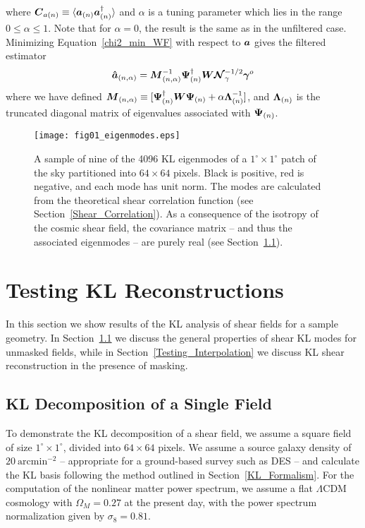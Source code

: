 where $\boldsymbol{C}_{a(n)}\equiv\langle 
\boldsymbol{a}_{(n)}\boldsymbol{a}_{(n)}^\dagger\rangle$ 
and $\alpha$ is a tuning parameter which lies in the range $0\le\alpha\le 1$. 
Note that for $\alpha=0$, the result is the same as in the unfiltered case.
Minimizing Equation~\ref{chi2_min_WF} with respect to $\boldsymbol{a}$ gives the
filtered estimator
\begin{equation}
  \label{a_WF}
  \boldsymbol{\hat{a}}_{(n,\alpha)} = 
  \boldsymbol{M}_{(n,\alpha)}^{-1} 
  \boldsymbol{\Psi}_{(n)}^\dagger \boldsymbol{W} \boldsymbol{\mathcal{N}}_\gamma^{-1/2}\boldsymbol{\gamma}^o
\end{equation}
where we have defined $\boldsymbol{M}_{(n,\alpha)} 
\equiv [\boldsymbol{\Psi}_{(n)}^\dagger\boldsymbol{W}\boldsymbol{\Psi}_{(n)} 
  + \alpha\boldsymbol{\Lambda}_{(n)}^{-1}]$, and
$\boldsymbol{\Lambda}_{(n)}$ is the truncated diagonal matrix of 
eigenvalues associated with $\boldsymbol{\Psi}_{(n)}$.

\begin{figure*}
 \centering
 \texttt{[image: fig01\_eigenmodes.eps]} 
 \caption{
   A sample of nine of the 4096 KL eigenmodes 
   of a $1^\circ\times 1^\circ$ patch of the sky partitioned into
   $64\times 64$ pixels.  Black is positive, red is negative, and each mode
   has unit norm. The modes are calculated from the theoretical
   shear correlation function (see Section~\ref{Shear_Correlation}).  
   As a consequence of the isotropy of the cosmic shear field,
   the covariance matrix -- and thus the associated eigenmodes --
   are purely real (see Section~\ref{Testing_Shear_KL}).
   \label{fig_KL_modes} }
\end{figure*} 

\section{Testing KL Reconstructions}
\label{Testing_Reconstruction}
In this section we show results of the KL analysis of shear fields for
a sample geometry.  In Section~\ref{Testing_Shear_KL} we discuss the general
properties of shear KL modes for unmasked fields, while in
Section~\ref{Testing_Interpolation} we discuss KL shear reconstruction 
in the presence of masking. 

\subsection{KL Decomposition of a Single Field}
\label{Testing_Shear_KL}
To demonstrate the KL decomposition of a shear field, we assume a square field
of size $1^\circ\times 1^\circ$, divided into $64\times 64$ pixels.  We assume
a source galaxy density of $20\ \mathrm{arcmin}^{-2}$ -- appropriate for a
ground-based survey such as DES -- and calculate the
KL basis following the method outlined in Section~\ref{KL_Formalism}.
For the computation of the nonlinear matter power spectrum, we assume a flat 
$\Lambda$CDM cosmology with $\Omega_M=0.27$ at the present day, with
the power spectrum normalization given by $\sigma_8=0.81$.

